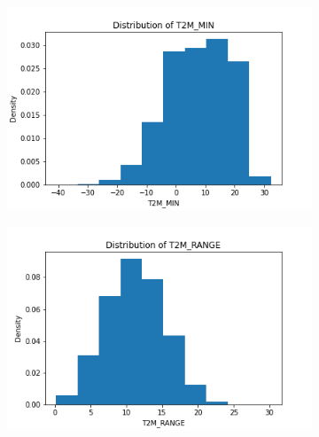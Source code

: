 \documentclass{article}
\begin{document}
\begin{itemize}
\begin{figure}[htbp]
\begin{subfigure}{0.3\textwidth}
            \end{subfigure}
            \begin{subfigure}{0.3\textwidth}
                \centering
                \includegraphics[width=\linewidth]{pic/hist/Distribution T2M_MIN .png}
            \end{subfigure}
            \begin{subfigure}{0.3\textwidth}
                \centering
                \includegraphics[width=\linewidth]{pic/hist/Distribution T2M_RANGE .png}
            \end{subfigure}
            \begin{subfigure}{0.3\textwidth}
                \centering

\end{subfigure}
\end{figure}
\end{itemize}
\end{document}
